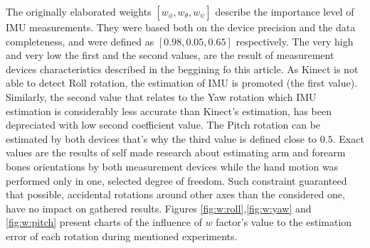 \documentclass[sensors,article,submit,moreauthors,pdftex,10pt,a4paper]{mdpi}
\begin{document}
The originally elaborated weights $[w_\phi , w_\theta , w_\psi]$ describe the importance level of IMU measurements. They were based both on the device precision and the data completeness, and were defined as $[0.98, 0.05, 0.65]$ respectively. The very high and very low the first and the second values, are the result of measurement devices characteristics described in the beggining fo this article. As Kinect is not able to detect Roll rotation, the estimation of IMU is promoted (the first value). Similarly, the second value that relates to the Yaw rotation which IMU estimation is considerably less accurate than Kinect's estimation, has been depreciated with low second coefficient value. The Pitch rotation can be estimated by both devices that's why the third value is defined close to $0.5$. Exact values are the results of  self made research about estimating arm and forearm bones orientations by both measurement devices while the hand motion was performed only in one, selected degree of freedom. Such constraint guaranteed that possible, accidental rotations around other axes than the considered one, have no impact on gathered results. Figures \ref{fig:w:roll},\ref{fig:w:yaw} and \ref{fig:w:pitch} present charts of the influence of $w$ factor's value to the estimation error of each rotation during mentioned experiments.
\end{document}
